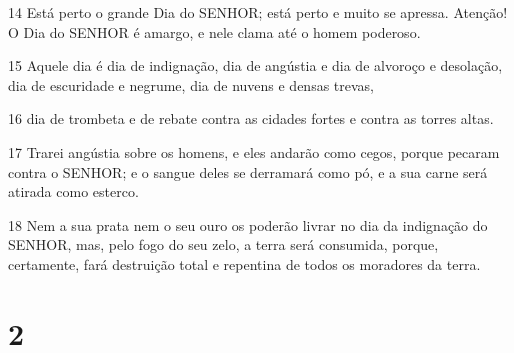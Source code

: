 \par 14 Está perto o grande Dia do SENHOR; está perto e muito se apressa. Atenção! O Dia do SENHOR é amargo, e nele clama até o homem poderoso.
\par 15 Aquele dia é dia de indignação, dia de angústia e dia de alvoroço e desolação, dia de escuridade e negrume, dia de nuvens e densas trevas,
\par 16 dia de trombeta e de rebate contra as cidades fortes e contra as torres altas.
\par 17 Trarei angústia sobre os homens, e eles andarão como cegos, porque pecaram contra o SENHOR; e o sangue deles se derramará como pó, e a sua carne será atirada como esterco.
\par 18 Nem a sua prata nem o seu ouro os poderão livrar no dia da indignação do SENHOR, mas, pelo fogo do seu zelo, a terra será consumida, porque, certamente, fará destruição total e repentina de todos os moradores da terra.

\chapter{2}

